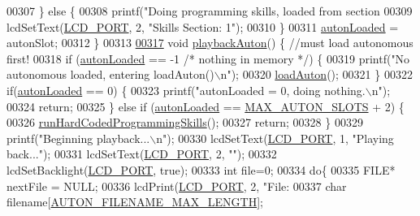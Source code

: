 \begin{DoxyCode}
{{{{{{{{{{{{{{{{{{{{{{{{{{{{{{{{{{{{{{{00307     \} \textcolor{keywordflow}{else} \{
00308         printf(\textcolor{stringliteral}{"Doing programming skills, loaded from section %
00309         lcdSetText(\hyperlink{lcdmsg_8h_abcf42bd88b3c36193f301ca25b033875}{LCD\_PORT}, 2, \textcolor{stringliteral}{"Skills Section: 1"});
00310     \}
00311     \hyperlink{autonrecorder_8c_a4e72d907ee74449b71b5e20943f4217e}{autonLoaded} = autonSlot;
00312 \}
00313 
\hypertarget{autonrecorder_8c_source.tex_l00317}{}\hyperlink{autonrecorder_8h_ae592a73a6bd9b2adcaa58a8ee82daaa0}{00317} \textcolor{keywordtype}{void} \hyperlink{autonrecorder_8c_ae592a73a6bd9b2adcaa58a8ee82daaa0}{playbackAuton}() \{ \textcolor{comment}{//must load autonomous first!}
00318     \textcolor{keywordflow}{if} (\hyperlink{autonrecorder_8c_a4e72d907ee74449b71b5e20943f4217e}{autonLoaded} == -1 \textcolor{comment}{/* nothing in memory */}) \{
00319         printf(\textcolor{stringliteral}{"No autonomous loaded, entering loadAuton()\(\backslash\)n"});
00320         \hyperlink{autonrecorder_8c_af6d130061f44459f9b3c629123e78f6e}{loadAuton}();
00321     \}
00322     \textcolor{keywordflow}{if}(\hyperlink{autonrecorder_8c_a4e72d907ee74449b71b5e20943f4217e}{autonLoaded} == 0) \{
00323         printf(\textcolor{stringliteral}{"autonLoaded = 0, doing nothing.\(\backslash\)n"});
00324         \textcolor{keywordflow}{return};
00325     \} \textcolor{keywordflow}{else} \textcolor{keywordflow}{if} (\hyperlink{autonrecorder_8c_a4e72d907ee74449b71b5e20943f4217e}{autonLoaded} == \hyperlink{autonrecorder_8h_a5173a11a545cb4020fdd139552dc15c1}{MAX\_AUTON\_SLOTS} + 2) \{
00326         \hyperlink{autonroutines_8c_adfa547bf86c78d482d16cb15a4ddd642}{runHardCodedProgrammingSkills}();
00327         \textcolor{keywordflow}{return};
00328     \}
00329     printf(\textcolor{stringliteral}{"Beginning playback...\(\backslash\)n"});
00330     lcdSetText(\hyperlink{lcdmsg_8h_abcf42bd88b3c36193f301ca25b033875}{LCD\_PORT}, 1, \textcolor{stringliteral}{"Playing back..."});
00331     lcdSetText(\hyperlink{lcdmsg_8h_abcf42bd88b3c36193f301ca25b033875}{LCD\_PORT}, 2, \textcolor{stringliteral}{""});
00332     lcdSetBacklight(\hyperlink{lcdmsg_8h_abcf42bd88b3c36193f301ca25b033875}{LCD\_PORT}, \textcolor{keyword}{true});
00333     \textcolor{keywordtype}{int} file=0;
00334     \textcolor{keywordflow}{do}\{
00335         FILE* nextFile = NULL;
00336         lcdPrint(\hyperlink{lcdmsg_8h_abcf42bd88b3c36193f301ca25b033875}{LCD\_PORT}, 2, \textcolor{stringliteral}{"File: %
00337         \textcolor{keywordtype}{char} filename[\hyperlink{autonrecorder_8h_a9411d1482daa18dd8221c30db7fc6e4e}{AUTON\_FILENAME\_MAX\_LENGTH}];
}}}}}}}}}}}}}}}}}}}}}}}}}}}}}}}}}}}}}}}}}
\end{DoxyCode}
